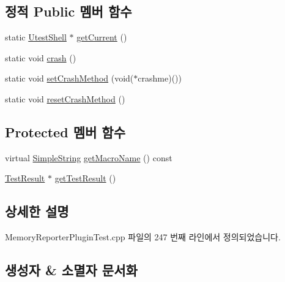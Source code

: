 \subsection*{정적 Public 멤버 함수}
\begin{DoxyCompactItemize}
\item 
static \hyperlink{class_utest_shell}{Utest\+Shell} $\ast$ \hyperlink{class_utest_shell_afeb97f1f06324a42444c71b412655122}{get\+Current} ()
\item 
static void \hyperlink{class_utest_shell_a4cd75601b53e872ab7a3b642fc825af3}{crash} ()
\item 
static void \hyperlink{class_utest_shell_a1b50094a723618e90533fe315e1e3101}{set\+Crash\+Method} (void($\ast$crashme)())
\item 
static void \hyperlink{class_utest_shell_a85913b4e2d993573f82518a10ec19cde}{reset\+Crash\+Method} ()
\end{DoxyCompactItemize}
\subsection*{Protected 멤버 함수}
\begin{DoxyCompactItemize}
\item 
virtual \hyperlink{class_simple_string}{Simple\+String} \hyperlink{class_utest_shell_abc98797be12f56d8e67d44e2328f885f}{get\+Macro\+Name} () const 
\item 
\hyperlink{class_test_result}{Test\+Result} $\ast$ \hyperlink{class_utest_shell_a34c525b685e30431750d9e355fdfff0c}{get\+Test\+Result} ()
\end{DoxyCompactItemize}


\subsection{상세한 설명}


Memory\+Reporter\+Plugin\+Test.\+cpp 파일의 247 번째 라인에서 정의되었습니다.



\subsection{생성자 \& 소멸자 문서화}
